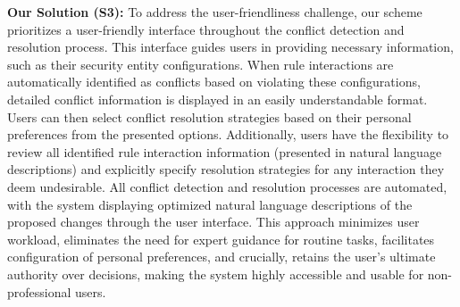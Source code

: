 \textbf{Our Solution (S3):} To address the user-friendliness challenge, our scheme prioritizes a user-friendly interface throughout the conflict detection and resolution process. This interface guides users in providing necessary information, such as their security entity configurations. When rule interactions are automatically identified as conflicts based on violating these configurations, detailed conflict information is displayed in an easily understandable format. Users can then select conflict resolution strategies based on their personal preferences from the presented options. Additionally, users have the flexibility to review all identified rule interaction information (presented in natural language descriptions) and explicitly specify resolution strategies for any interaction they deem undesirable. All conflict detection and resolution processes are automated, with the system displaying optimized natural language descriptions of the proposed changes through the user interface. This approach minimizes user workload, eliminates the need for expert guidance for routine tasks, facilitates configuration of personal preferences, and crucially, retains the user's ultimate authority over decisions, making the system highly accessible and usable for non-professional users.

